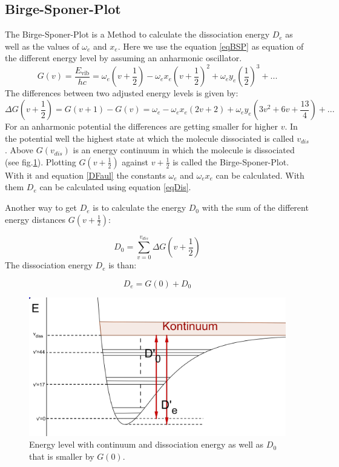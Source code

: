 \subsection{Birge-Sponer-Plot}
The Birge-Sponer-Plot is a Method to calculate the dissociation energy $D_e$ as well as the values of $\omega_e$ and $x_e$.
Here we use the equation \ref{eqBSP} as equation of the different energy level by assuming an anharmonic oscillator. 
\begin{equation}
	G(v)=\frac{E_{\text{vib}}}{hc}=\omega_e(v+\frac{1}{2})-\omega_ex_e(v+\frac{1}{2})^2+\omega_ey_e(\frac{1}{2})^3+...
	\label{eqBSP}
\end{equation}
The differences between two adjusted energy levels is given by:
\begin{equation}
	\Delta G(v+\frac{1}{2})=G(v+1)-G(v)=\omega_e-\omega_ex_e(2v+2)+\omega_ey_e(3v^2+6v+\frac{13}{4})+...
	\label{DFaul}
\end{equation}
For an anharmonic potential the differences are getting smaller for higher $v$.
In the potential well the highest state at which the molecule dissociated is called $v_{dis}$. Above $G(v_{dis})$ is an energy continuum in which the molecule is dissociated (see fig.\ref{figCon}). Plotting $ G(v+\frac{1}{2})$ against $v+\frac{1}{2}$ is called the Birge-Sponer-Plot. With it and equation \ref{DFaul} the constants $\omega_e$ and $\omega_ex_e$ can be calculated. With them $D_e$ can be calculated using equation \ref{eqDis}.\par
Another way to get $D_e$ is to calculate the energy $D_0$ with the sum of the different energy distances $G(v+\frac{1}{2})$:\par
\begin{equation}
	D_0=\sum_{v=0}^{v_{dis}}\Delta G(v+\frac{1}{2})
	\label{D0}
\end{equation}
The dissociation energy $D_e$ is than:\par
\begin{equation}
	D_e=G(0)+D_0
	\label{De2}
\end{equation}
\begin{figure}[ht]
	\includegraphics[scale=1.5]{Bild/PlotBirgeSponer.PNG}
	\centering
	\caption{Energy level with continuum and dissociation energy as well as $D_0$ that is smaller by $ G(0)$.\cite{Anleitung}}
	\label{figCon}
\end{figure}
\newpage
